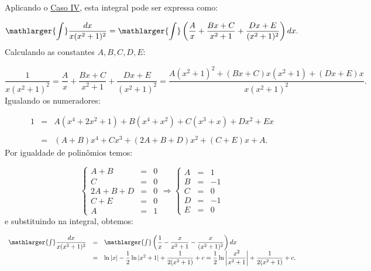\cleardoublepage\documentclass[../main.tex]{subfiles}
\begin{document}
\begin{exeresol}
\begin{compactenum}[a)]
\begin{solution}
Aplicando o \hyperlink{FracParcCasoIV}{Caso IV}, esta integral pode ser expressa como:

\[ \mathlarger{\int}\dfrac{dx}{x(x^2+1)^2} = \mathlarger{\int}\left(\dfrac{A}{x}+\dfrac{Bx+C}{x^2+1}+ \dfrac{Dx+E}{(x^2+1)^2}\right) dx. \]
Calculando as constantes \(A,B,C, D, E\):

\[ \dfrac{1}{x(x^2+1)^2} =\dfrac{A}{x}+\dfrac{Bx+C}{x^2+1}+ \dfrac{Dx+E}{(x^2+1)^2}= \dfrac{A(x^2+1)^2+(Bx+C)x(x^2+1)+(Dx+E)x}{x(x^2+1)^2}. \]
Igualando os numeradores:

\[ \begin{array}{rcl} 1 &=& A(x^4+2x^2+1)+ B(x^4+x^2)+C(x^3+x)+Dx^2 +Ex\\ \\ &=&(A+B)x^4+Cx^3 +(2A+B+D)x^2+(C+E)x+A. \end{array} \]
Por igualdade de polinômios temos:

\[ \left\{ \begin{array}{rcl} A+B&=&0\\ C &=&0\\ 2A+B+D&=&0\\ C+E&=&0\\ A&=&1 \end{array} \right. \Rightarrow \left\{ \begin{array}{ccr} A&=& 1\\ B&=&-1\\ C&=&0\\ D&=&-1\\ E&=&0 \end{array} \right. \]
e substituindo na integral, obtemos:

\[ \begin{array}{rcl} \mathlarger{\int}\dfrac{dx}{x(x^2+1)^2} &=& \mathlarger{\int}\left(\dfrac{1}{x}-\dfrac{x}{x^2+1}- \dfrac{x}{(x^2+1)^2}\right) dx\\ &=& \ln|x|- \dfrac{1}{2}\ln|x^2+1| +\dfrac{1}{2(x^2+1)}+c = \dfrac{1}{2}\ln\left|\dfrac{x^2}{ x^2+1} \right| +\dfrac{1}{2(x^2+1)}+c. \end{array} \]
\end{solution}
  \end{compactenum}
\end{exeresol}
\end{document}
